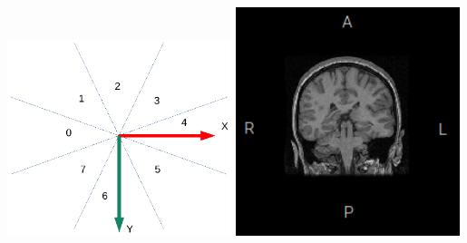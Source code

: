\documentclass[aspectratio=169]{beamer}
\begin{document}
\begin{frame}[t]
\begin{columns}[t]
        \includegraphics[width=0.49\textwidth]{img/imageorientationindicator-004.pdf}
        \includegraphics[width=0.49\textwidth]{img/imageorientationindicator-005.png}
    \end{columns}
\end{frame}
\end{document}
